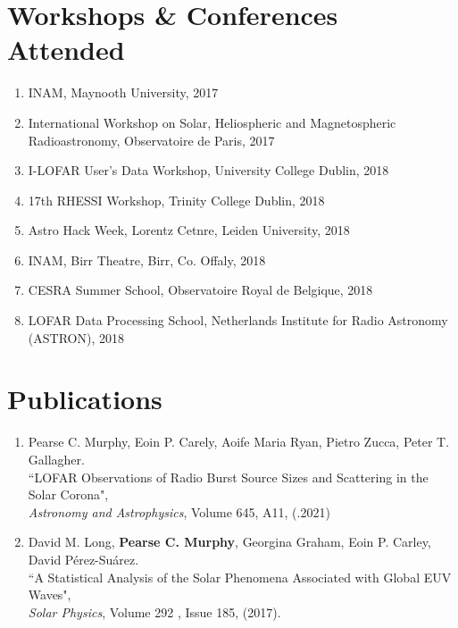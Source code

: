 \begin{singlespace}
%
\section*{Workshops \& Conferences Attended}
\begin{enumerate}
\item INAM, Maynooth University, 2017
\item International Workshop on Solar, Heliospheric and Magnetospheric Radioastronomy, Observatoire de Paris, 2017
\item I-LOFAR User's Data Workshop, University College Dublin, 2018
\item 17th RHESSI Workshop, Trinity College Dublin, 2018
\item Astro Hack Week, Lorentz Cetnre, Leiden University, 2018
\item INAM, Birr Theatre, Birr, Co. Offaly, 2018
\item CESRA Summer School, Observatoire Royal de Belgique, 2018 
\item LOFAR Data Processing School, Netherlands Institute for Radio Astronomy (ASTRON), 2018
\end{enumerate}

\section*{Publications}
\begin{enumerate}
\item Pearse C. Murphy, Eoin P. Carely, Aoife Maria Ryan, Pietro Zucca, Peter T. Gallagher.
\\ ``LOFAR Observations of Radio Burst Source Sizes and Scattering in the Solar Corona",
\\ \textit{Astronomy and Astrophysics}, Volume 645, A11, (.2021)
\item David M. Long, \textbf{Pearse C. Murphy}, Georgina Graham, Eoin P. Carley, David P\'{e}rez-Su\'{a}rez.
\\ ``A Statistical Analysis of the Solar Phenomena Associated with Global EUV Waves",
\\ \textit{Solar Physics}, Volume 292 , Issue 185, (2017).
\end{enumerate}




\end{singlespace}




